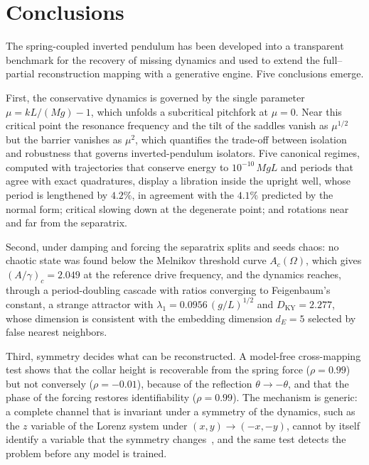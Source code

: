\section{Conclusions}\label{sec:conclusions}

The spring-coupled inverted pendulum has been developed into a transparent benchmark for the recovery of missing dynamics and used to extend the full--partial reconstruction mapping with a generative engine. Five conclusions emerge.

First, the conservative dynamics is governed by the single parameter $\mu=kL/(Mg)-1$, which unfolds a subcritical pitchfork at $\mu=0$. Near this critical point the resonance frequency and the tilt of the saddles vanish as $\mu^{1/2}$ but the barrier vanishes as $\mu^{2}$, which quantifies the trade-off between isolation and robustness that governs inverted-pendulum isolators. Five canonical regimes, computed with trajectories that conserve energy to $10^{-10}\,MgL$ and periods that agree with exact quadratures, display a libration inside the upright well, whose period is lengthened by $4.2\%$, in agreement with the $4.1\%$ predicted by the normal form; critical slowing down at the degenerate point; and rotations near and far from the separatrix.

Second, under damping and forcing the separatrix splits and seeds chaos: no chaotic state was found below the Melnikov threshold curve $A_c(\Omega)$, which gives $(A/\gamma)_c=2.049$ at the reference drive frequency, and the dynamics reaches, through a period-doubling cascade with ratios converging to Feigenbaum's constant, a strange attractor with $\lambda_1=0.0956\,(g/L)^{1/2}$ and $D_{\mathrm{KY}}=2.277$, whose dimension is consistent with the embedding dimension $d_E=5$ selected by false nearest neighbors.

Third, symmetry decides what can be reconstructed. A model-free cross-mapping test shows that the collar height is recoverable from the spring force ($\rho=0.99$) but not conversely ($\rho=-0.01$), because of the reflection $\theta\to-\theta$, and that the phase of the forcing restores identifiability ($\rho=0.99$). The mechanism is generic: a complete channel that is invariant under a symmetry of the dynamics, such as the $z$ variable of the Lorenz system under $(x,y)\to(-x,-y)$, cannot by itself identify a variable that the symmetry changes~\cite{LetellierAguirre2002}, and the same test detects the problem before any model is trained.

